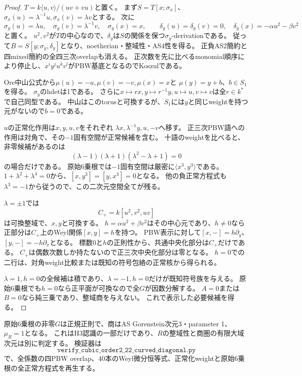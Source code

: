 \begin{proof}
$T=k\langle u,v\rangle/(uv+vu)$と置く。
まず$S=T[x;\sigma_x]$、$\sigma_x(u)=\lambda^{-1}u,\sigma_x(v)=\lambda v$とする。
次に
\[
 \sigma_y(u)=\lambda u,\quad\sigma_y(v)=\lambda^{-1}v,\quad\sigma_y(x)=x,
 \qquad\delta_y(u)=\delta_y(v)=0,\quad
 \delta_y(x)=-\alpha u^2-\beta v^2
\]
と置く。
$u^2,v^2$が$T$の中心なので、$\delta_y$は$S$の関係を保つ$\sigma_y$-derivationである。
従って$B=S[y;\sigma_y,\delta_y]$となり、noetherian・整域性・AS4性を得る。
正負AS2簡約と四mixed簡約の全四三次overlapも消える。
正次数を先に比べるmonomial順序により停止し、$x^iy^ju^kv^l$がPBW基底となるのでKoszulである。

Ore中山公式から$\mu(u)=-u,\mu(v)=-v,\mu(x)=x$と
$\mu(y)=y+b$、$b\in S_1$を得る。
$\sigma_y$のhdetは1である。
さらに$x\mapsto r x,y\mapsto r^{-1}y,u\mapsto u,v\mapsto v$は全$r\in k^*$で自己同型である。
中山はこのtorusと可換するが、$S_1$には$y$と同じweightを持つ元がないので$b=0$である。

$u$の正常化作用は$x,y,u,v$をそれぞれ
$\lambda x,\lambda^{-1}y,u,-v$へ移す。
正三次PBW語への作用は対角で、その$-1$固有空間が正常候補を含む。
十語のweightを比べると、非零候補があるのは
\[
 (\lambda-1)(\lambda+1)(\lambda^2-\lambda+1)=0
\]
の場合だけである。
原始6乗根では$-1$固有空間は厳密に$\langle x^3,y^3\rangle$である。
$1+\lambda^2+\lambda^4=0$から、$[x,y^3]=[y,x^3]=0$となる。
他の負正常方程式も$\lambda^3=-1$から従うので、この二次元空間全てが残る。

$\lambda=\pm1$では
\[
 C_+=k[u^2,v^2,uv]
\]
は可換整域で、$x,y$と可換する。
$h=\alpha u^2+\beta v^2$はその中心元であり、$h\ne0$なら正部分は$C_+$上のWeyl関係$[x,y]=h$を持つ。
PBW表示に対して$[x,-]=h\partial_y$、$[y,-]=-h\partial_x$となる。
標数0と$h$の正則性から、共通中央化部分は$C_+$だけである。
$C_+$は偶数次数しか持たないので正三次中央化部分は零となる。
$h=0$での二行は、対角weight比較または既知の符号包絡の正常核から得られる。

$\lambda=1,h=0$の全候補は積であり、$\lambda=-1,h=0$だけが既知符号族を与える。
原始6乗根でも$h=0$なら正平面が可換なので全$G$が因数分解する。
$A=0$または$B=0$なら純三乗であり、整域商を与えない。
これで表示した必要候補を得る。
\end{proof}

原始6乗根の非零$G$は正規正則で、商はAS Gorenstein次元3・parameter 1、$\mu_R=1$となる。
これはH3認識の一部だけであり、$R$の整域性と商圏の有限大域次元は別に判定する。
検証器は
\[
 \texttt{verify\_cubic\_order2\_22\_curved\_diagonal.py}
\]
で、全係数の四PBW overlap、40本のWeyl微分恒等式、正常化weightと原始6乗根の全正常方程式を再生する。
